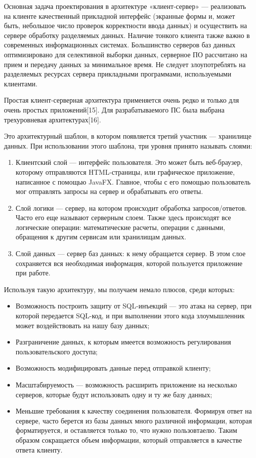 Основная задача проектирования в архитектуре «клиент-сервер» — реализовать на клиенте качественный прикладной интерфейс (экранные формы и, может быть, небольшое число проверок корректности ввода данных) и осуществить на сервере обработку разделяемых данных.
Наличие тонкого клиента также важно в современных информационных системах.
Большинство серверов баз данных оптимизировано для селективной выборки данных, серверное ПО рассчитано на прием и передачу данных за минимальное время.
Не следует злоупотреблять на разделяемых ресурсах сервера прикладными программами, используемыми клиентами.

Простая клиент-серверная архитектура применяется очень редко и только для очень простых приложений[15].
Для разрабатываемого ПС была выбрана трехуровневая архитектурах[16].

Это архитектурный шаблон, в котором появляется третий участник — хранилище данных.
При использовании этого шаблона, три уровня принято называть слоями:
\begin{enumerate}
    \item Клиентский слой — интерфейс пользователя.
    Это может быть веб-браузер, которому отправляются HTML-страницы, или графическое приложение, написанное с помощью JavaFX.
    Главное, чтобы с его помощью пользователь мог отправлять запросы на сервер и обрабатывать его ответы.
    \item Слой логики — сервер, на котором происходит обработка запросов/ответов.
    Часто его еще называют серверным слоем.
    Также здесь происходят все логические операции: математические расчеты, операции с данными, обращения к другим сервисам или хранилищам данных.
    \item Слой данных — сервер баз данных: к нему обращается сервер.
    В этом слое сохраняется вся необходимая информация, которой пользуется приложение при работе.
\end{enumerate}

Используя такую архитектуру, мы получаем немало плюсов, среди которых:
\begin{itemize}
    \item Возможность построить защиту от SQL-инъекций — это атака на сервер, при которой передается SQL-код, и при выполнении этого кода злоумышленник может воздействовать на нашу базу данных;
    \item Разграничение данных, к которым имеется возможность регулирования пользовательского доступа;
    \item Возможность модифицировать данные перед отправкой клиенту;
    \item Масштабируемость — возможность расширить приложение на несколько серверов, которые будут использовать одну и ту же базу данных;
    \item Меньшие требования к качеству соединения пользователя.
    Формируя ответ на сервере, часто берется из базы данных много различной информации, которая форматируется, и оставляется только то, что нужно пользовтаелю.
    Таким образом сокращается объем информации, который отправляется в качестве ответа клиенту.
\end{itemize}

